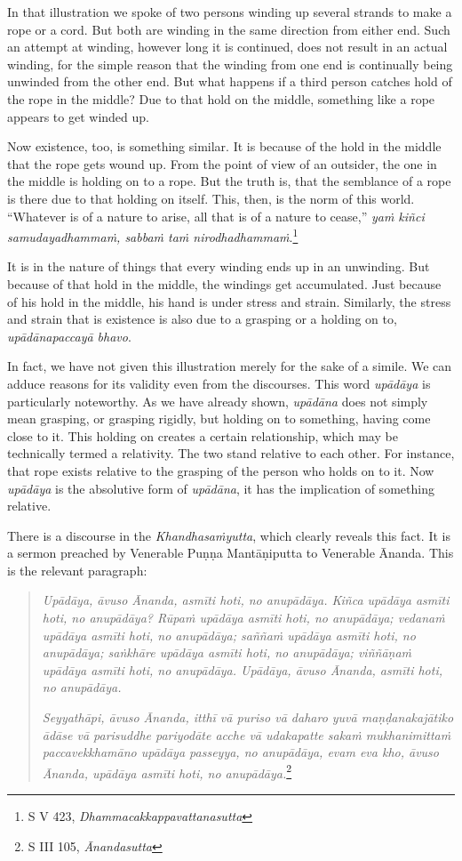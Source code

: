 In that illustration we spoke of two persons winding up several strands to make a rope or a cord. But both are winding in the same direction from either end. Such an attempt at winding, however long it is continued, does not result in an actual winding, for the simple reason that the winding from one end is continually being unwinded from the other end. But what happens if a third person catches hold of the rope in the middle? Due to that hold on the middle, something like a rope appears to get winded up.

Now existence, too, is something similar. It is because of the hold in the middle that the rope gets wound up. From the point of view of an outsider, the one in the middle is holding on to a rope. But the truth is, that the semblance of a rope is there due to that holding on itself. This, then, is the norm of this world. ``Whatever is of a nature to arise, all that is of a nature to cease,'' \emph{yaṁ kiñci samudayadhammaṁ, sabbaṁ taṁ nirodhadhammaṁ}.\footnote{S V 423, \emph{Dhammacakkappavattanasutta}}

It is in the nature of things that every winding ends up in an unwinding. But because of that hold in the middle, the windings get accumulated. Just because of his hold in the middle, his hand is under stress and strain. Similarly, the stress and strain that is existence is also due to a grasping or a holding on to, \emph{upādānapaccayā bhavo}.

In fact, we have not given this illustration merely for the sake of a simile. We can adduce reasons for its validity even from the discourses. This word \emph{upādāya} is particularly noteworthy. As we have already shown, \emph{upādāna} does not simply mean grasping, or grasping rigidly, but holding on to something, having come close to it. This holding on creates a certain relationship, which may be technically termed a relativity. The two stand relative to each other. For instance, that rope exists relative to the grasping of the person who holds on to it. Now \emph{upādāya} is the absolutive form of \emph{upādāna}, it has the implication of something relative.

There is a discourse in the \emph{Khandhasaṁyutta}, which clearly reveals this fact. It is a sermon preached by Venerable Puṇṇa Mantāṇiputta to Venerable Ānanda. This is the relevant paragraph:

\begin{quote}
\emph{Upādāya, āvuso Ānanda, asmīti hoti, no anupādāya. Kiñca upādāya asmīti hoti, no anupādāya? Rūpaṁ upādāya asmīti hoti, no anupādāya; vedanaṁ upādāya asmīti hoti, no anupādāya; saññaṁ upādāya asmīti hoti, no anupādāya; saṅkhāre upādāya asmīti hoti, no anupādāya; viññāṇaṁ upādāya asmīti hoti, no anupādāya. Upādāya, āvuso Ānanda, asmīti hoti, no anupādāya.}

\emph{Seyyathāpi, āvuso Ānanda, itthī vā puriso vā daharo yuvā maṇḍanakajātiko ādāse vā parisuddhe pariyodāte acche vā udakapatte sakaṁ mukhanimittaṁ paccavekkhamāno upādāya passeyya, no anupādāya, evam eva kho, āvuso Ānanda, upādāya asmīti hoti, no anupādāya.}\footnote{S III 105, \emph{Ānandasutta}}
\end{quote}

